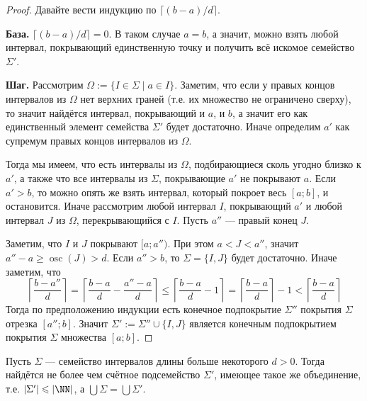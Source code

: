 \documentclass[12pt,a4paper]{article}
\DeclareMathOperator{\osc}{osc}
\begin{document}
    \begin{proof}
        Давайте вести индукцию по $\lceil (b-a)/d \rceil$.

        \textbf{База.} $\lceil (b-a)/d \rceil = 0$. В таком случае $a = b$, а значит, можно взять любой интервал, покрывающий единственную точку и получить всё искомое семейство $\Sigma'$.

        \textbf{Шаг.} Рассмотрим $\Omega := \{I \in \Sigma \mid a \in I\}$. Заметим, что если у правых концов интервалов из $\Omega$ нет верхних граней (т.е. их множество не ограничено сверху), то значит найдётся интервал, покрывающий и $a$, и $b$, а значит его как единственный элемент семейства $\Sigma'$ будет достаточно. Иначе определим $a'$ как супремум правых концов интервалов из $\Omega$.
        
        Тогда мы имеем, что есть интервалы из $\Omega$, подбирающиеся сколь угодно близко к $a'$, а также что все интервалы из $\Sigma$, покрывающие $a'$ не покрывают $a$. Если $a' > b$, то можно опять же взять интервал, который покроет весь $[a; b]$, и остановится. Иначе рассмотрим любой интервал $I$, покрывающий $a'$ и любой интервал $J$ из $\Omega$, перекрывающийся с $I$. Пусть $a''$ --- правый конец $J$.

        Заметим, что $I$ и $J$ покрывают $[a; a'')$. При этом $a < J < a''$, значит $a'' - a \geqslant \osc(J) > d$. Если $a'' > b$, то $\Sigma = \{I, J\}$ будет достаточно. Иначе заметим, что
        \[
            \left\lceil \frac{b-a''}{d} \right\rceil =
            \left\lceil \frac{b-a}{d} - \frac{a''-a}{d} \right\rceil \leqslant
            \left\lceil \frac{b-a}{d} - 1 \right\rceil =
            \left\lceil \frac{b-a}{d} \right\rceil - 1 <
            \left\lceil \frac{b-a}{d} \right\rceil
        \]
        Тогда по предположению индукции есть конечное подпокрытие $\Sigma''$ покрытия $\Sigma$ отрезка $[a''; b]$. Значит $\Sigma' := \Sigma'' \cup \{I, J\}$ является конечным подпокрытием покрытия $\Sigma$ множества $[a; b]$.
    \end{proof}

    \begin{lemma}\label{edged_subcover_great_lemma}
        Пусть $\Sigma$ --- семейство интервалов длины больше некоторого $d > 0$. Тогда найдётся не более чем счётное подсемейство $\Sigma'$, имеющее такое же объединение, т.е. $|\Sigma'| \leqslant |\NN|$, а $\bigcup \Sigma = \bigcup \Sigma'$.
    \end{lemma}
\end{document}
